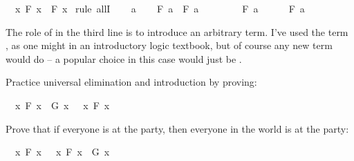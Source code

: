 \begin{isabellebody}
\ {\isachardoublequoteopen}{\isasymforall}\ x{\isachardot}\ F\ x\ {\isasymlongrightarrow}\ F\ x{\isachardoublequoteclose}\isanewline
%
\isadelimproof
%
\endisadelimproof
%
\isatagproof
{}\isamarkupfalse%
\ {\isacharparenleft}rule\ allI{\isacharparenright}\isanewline
\ \ \isamarkupfalse%
\ a\isanewline
\ \ \isamarkupfalse%
\ {\isachardoublequoteopen}F\ a\ {\isasymlongrightarrow}\ F\ a{\isachardoublequoteclose}\isanewline
\ \ \isamarkupfalse%
\isanewline
\ \ \ \ \isamarkupfalse%
\ {\isachardoublequoteopen}F\ a{\isachardoublequoteclose}\isanewline
\ \ \ \ \isamarkupfalse%
\ {\isachardoublequoteopen}F\ a{\isachardoublequoteclose}\isacommand{{\isachardot}}\isamarkupfalse%
\isanewline
\ \ \isamarkupfalse%
\isanewline
{}\isamarkupfalse%
%
\endisatagproof
{\isafoldproof}%
%
\isadelimproof
%
\endisadelimproof
%
\begin{isamarkuptext}%
The role of  in the third line is to introduce an arbitrary term. I've used the
term , as one might in an introductory logic textbook, but of course any new term would do 
-- a popular choice in this case would just be .%
\end{isamarkuptext}\isamarkuptrue%
%
\begin{isamarkuptext}%
\begin{Exercise} Practice universal elimination and introduction by proving: \end{Exercise}%
\end{isamarkuptext}\isamarkuptrue%
\isamarkupfalse%
\ {\isachardoublequoteopen}{\isacharparenleft}{\isasymforall}\ x{\isachardot}\ F\ x\ {\isasymand}\ G\ x{\isacharparenright}\ {\isasymlongrightarrow}\ {\isacharparenleft}{\isasymforall}\ x{\isachardot}\ F\ x{\isacharparenright}{\isachardoublequoteclose}%
\isadelimproof
\ %
\endisadelimproof
%
\isatagproof
{}\isamarkupfalse%
%
\endisatagproof
{\isafoldproof}%
%
\isadelimproof
%
\endisadelimproof
%
\begin{isamarkuptext}%
\begin{Exercise} Prove that if everyone is at the party, then everyone in the world is at the party: \end{Exercise}%
\end{isamarkuptext}\isamarkuptrue%
\isamarkupfalse%
\ {\isachardoublequoteopen}{\isacharparenleft}{\isasymforall}\ x{\isachardot}\ F\ x{\isacharparenright}\ {\isasymlongrightarrow}\ {\isacharparenleft}{\isasymforall}\ x{\isachardot}\ F\ x\ {\isasymlongrightarrow}\ G\ x{\isacharparenright}{\isachardoublequoteclose}%

\end{isabellebody}
